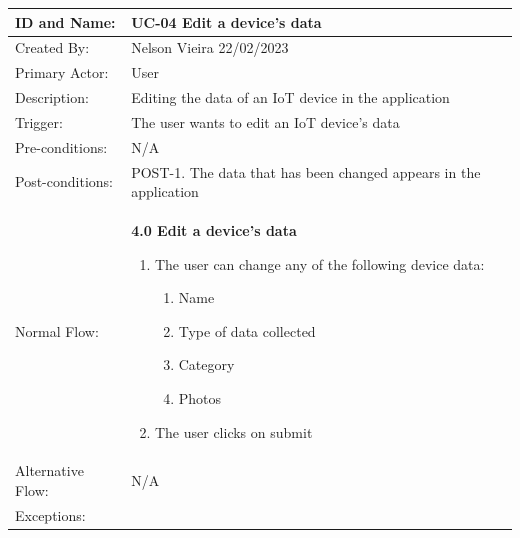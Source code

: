\documentclass{scrreprt}
\begin{document}
\begin{table}[H]
    \centering
    \begin{adjustbox}{width=1.1\textwidth,center=\textwidth}
        \begin{tabular}{|m{4cm}|m{12cm}|}
            \hline
            ID and Name: & UC-04 Edit a device's data \\
            \hline
            Created By: & Nelson Vieira 22/02/2023 \\
            \hline
            Primary Actor: & User \\
            \hline
            Description: & Editing the data of an IoT device in the application \\
            \hline
            Trigger: & The user wants to edit an IoT device's data \\
            \hline
            Pre-conditions: & N/A \\
            \hline
            Post-conditions: & POST-1. The data that has been changed appears in the application \\
            \hline
            Normal Flow: & \textbf{4.0 Edit a device's data}
            \begin{enumerate}
                \item The user can change any of the following device data:
                \begin{enumerate}
                    \item Name
                    \item Type of data collected
                    \item Category
                    \item Photos
                \end{enumerate}
                \item The user clicks on submit
            \end{enumerate} \\
            \hline
            Alternative Flow: & N/A \\
            \hline
            Exceptions: &

\end{tabular}
\end{adjustbox}
\end{table}
\end{document}

